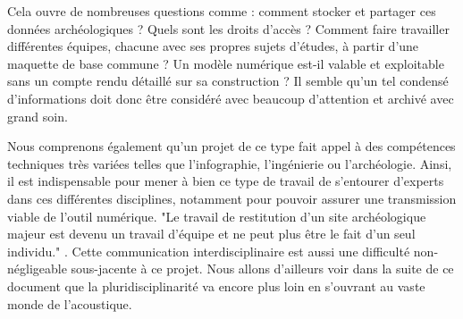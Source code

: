 Cela ouvre de nombreuses questions comme : comment stocker et partager ces données archéologiques ? Quels sont les droits d'accès ? Comment faire travailler différentes équipes, chacune avec ses propres sujets d'études, à partir d'une maquette de base commune ? Un modèle numérique est-il valable et exploitable sans un compte rendu détaillé sur sa construction ? Il semble qu'un tel condensé d'informations doit donc être considéré avec beaucoup d'attention et archivé avec grand soin. 

Nous comprenons également qu'un projet de ce type fait appel à des compétences techniques très variées telles que l'infographie, l'ingénierie ou l'archéologie. Ainsi, il est indispensable pour mener à bien ce type de travail de s'entourer d'experts dans ces différentes disciplines, notamment pour pouvoir assurer une transmission viable de l'outil numérique. "Le travail de restitution d’un site archéologique majeur est devenu un travail d’équipe et ne peut plus être le fait d’un seul individu." \cite[p. 158]{archeogrid}. Cette communication interdisciplinaire est aussi une difficulté non-négligeable sous-jacente à ce projet. Nous allons d'ailleurs voir dans la suite de ce document que la pluridisciplinarité va encore plus loin en s'ouvrant au vaste monde de l'acoustique. 
	
	
			
 
 


